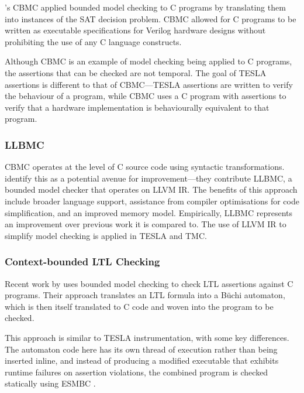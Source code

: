 \citeauthor{clarke_behavioral_2003}'s CBMC \cite{clarke_behavioral_2003} applied
bounded model checking to C programs by translating them into instances of the
SAT decision problem. CBMC allowed for C programs to be written as executable
specifications for Verilog hardware designs without prohibiting the
use of any C language constructs.

Although CBMC is an example of model checking being applied to C programs, the
assertions that can be checked are not temporal. The goal of TESLA assertions is
different to that of CBMC---TESLA assertions are written to verify the behaviour
of a program, while CBMC uses a C program with assertions to verify that a
hardware implementation is behaviourally equivalent to that program.

\subsubsection{LLBMC}

CBMC operates at the level of C source code using syntactic transformations.
\textcite{merz_llbmc:_2012} identify this as a potential avenue for
improvement---they contribute LLBMC, a bounded model checker that operates on
LLVM \cite{lattner_llvm:_2002} IR. The benefits of this approach include broader
language support, assistance from compiler optimisations for code
simplification, and an improved memory model.  Empirically, LLBMC represents an
improvement over previous work it is compared to. The use of LLVM IR to simplify
model checking is applied in TESLA and TMC.

\subsubsection{Context-bounded LTL Checking}

Recent work by \textcite{morse_context-bounded_2011,
morse_model_2015-1} uses bounded model checking to check LTL assertions
against C programs. Their approach translates an LTL
formula into a B\"uchi automaton, which is then itself translated to C
code and woven into the program to be checked.

This approach is similar to TESLA instrumentation, with some key
differences. The automaton code here has its own thread of execution rather than
being inserted inline, and instead of producing a modified executable that
exhibits runtime failures on assertion violations, the combined program is
checked statically using ESMBC \cite{cordeiro_smt-based_2009}.

